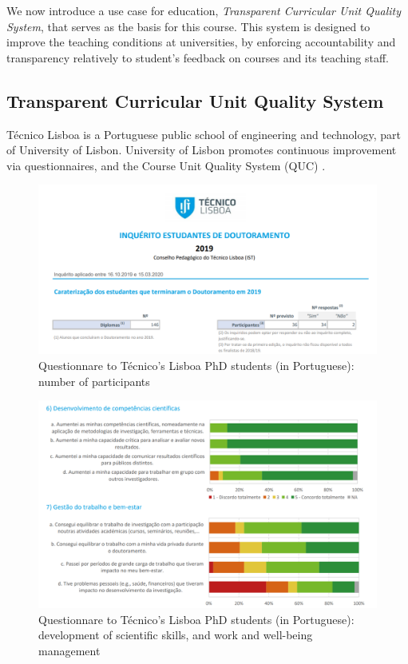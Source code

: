 \documentclass[12pt,a4paper]{article}
\theoremstyle{definition}
\begin{document}
We now introduce a use case for education, \emph{Transparent Curricular Unit Quality System}, that serves as the basis for this course. This system is designed to improve the teaching conditions at universities, by enforcing accountability and transparency relatively to student's feedback on courses and its teaching staff. 

\subsection{Transparent Curricular Unit Quality System}
Técnico Lisboa is a Portuguese  public school of engineering and technology, part of University of Lisbon. University of Lisbon promotes continuous improvement via questionnaires, and the Course Unit Quality System (QUC) \cite{quc}.


\begin{figure}
    \centering
    \includegraphics[scale=0.8]{figures/quc_3_1.PNG}
    \caption{Questionnare to Técnico's Lisboa PhD students (in Portuguese): number of participants}
    \label{fig:quc_3_1}
\end{figure}

\begin{figure}
    \centering
    \includegraphics[scale=0.6]{figures/quc_3_2.PNG}
    \caption{Questionnare to Técnico's Lisboa PhD students (in Portuguese): development of scientific skills, and work and well-being management}
    \label{fig:quc_3_1}
\end{figure}
\end{document}

